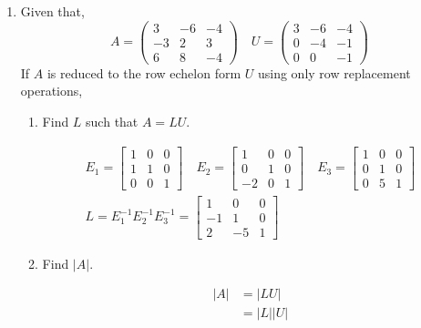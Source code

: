 \documentclass{zc-ust-hw}
\begin{document}
\begin{enumerate}
  \item Given that,
    \begin{equation}
      A=\left(\begin{array}{ccc}
          3 & -6 & -4 \\
          -3 & 2 & 3 \\
          6 & 8 & -4
      \end{array}\right)
      \quad
      U=\left(\begin{array}{ccc}
          3 & -6 & -4 \\
          0 & -4 & -1 \\
          0 & 0 & -1
      \end{array}\right)
    \end{equation}
    If $A$ is reduced to the row echelon form $U$ using only row replacement operations,
    \begin{enumerate}
      \item Find $L$ such that $A=LU$.
        \begin{sol}
          \begin{gather}
            E_1 = \begin{bmatrix} 1 & 0 & 0 \\ 1 & 1 & 0 \\ 0 & 0 & 1 \end{bmatrix}
            \quad
            E_2 = \begin{bmatrix} 1 & 0 & 0 \\ 0 & 1 & 0 \\ -2 & 0 & 1 \end{bmatrix}
            \quad
            E_3 = \begin{bmatrix} 1 & 0 & 0 \\ 0 & 1 & 0 \\ 0 & 5 & 1 \end{bmatrix} \\
            L = E_1^{-1}E_2^{-1}E_3^{-1} = \begin{bmatrix} 1 & 0 & 0 \\ -1 & 1 & 0 \\ 2 & -5 & 1 \end{bmatrix}
          \end{gather}
        \end{sol}
      \item Find $|A|$.
        \begin{sol}
          \begin{align}
            |A| &= |LU| \\
            &= |L||U| \\

\end{align}
\end{sol}
\end{enumerate}
\end{enumerate}
\end{document}
